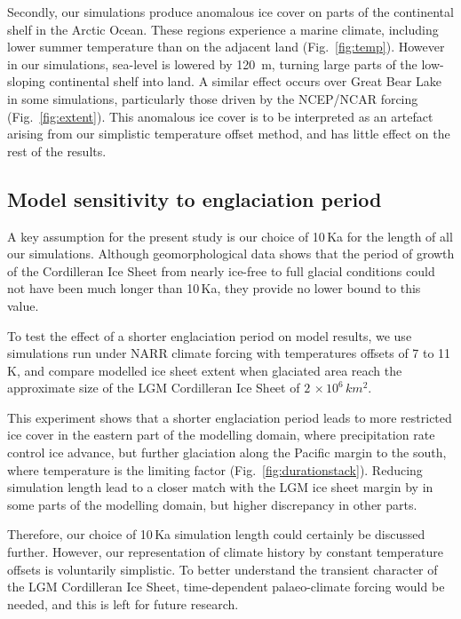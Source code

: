 Secondly, our simulations produce anomalous ice cover on parts of the continental shelf in the Arctic Ocean. These regions experience a marine climate, including lower summer temperature than on the adjacent land (Fig.~\ref{fig:temp}). However in our simulations, sea-level is lowered by 120~m, turning large parts of the low-sloping continental shelf into land. A similar effect occurs over Great Bear Lake in some simulations, particularly those driven by the NCEP/NCAR forcing (Fig.~\ref{fig:extent}). This anomalous ice cover is to be interpreted as an artefact arising from our simplistic temperature offset method, and has little effect on the rest of the results.

\subsection{Model sensitivity to englaciation period}

A key assumption for the present study is our choice of 10\,Ka for the length of all our simulations. Although geomorphological data shows that the period of growth of the Cordilleran Ice Sheet from nearly ice-free to full glacial conditions could not have been much longer than 10\,Ka, they provide no lower bound to this value.

To test the effect of a shorter englaciation period on model results, we use simulations run under NARR climate forcing with temperatures offsets of 7 to 11\,K, and compare modelled ice sheet extent when glaciated area reach the approximate size of the LGM Cordilleran Ice Sheet of $2\,\times10^6\,\unit{km^2}$.

This experiment shows that a shorter englaciation period leads to more restricted ice cover in the eastern part of the modelling domain, where precipitation rate control ice advance, but further glaciation along the Pacific margin to the south, where temperature is the limiting factor (Fig.~\ref{fig:durationstack}). Reducing simulation length lead to a closer match with the LGM ice sheet margin by \citet{dyke-2004} in some parts of the modelling domain, but higher discrepancy in other parts.

Therefore, our choice of 10\,Ka simulation length could certainly be discussed further. However, our representation of climate history by constant temperature offsets is voluntarily simplistic. To better understand the transient character of the LGM Cordilleran Ice Sheet, time-dependent palaeo-climate forcing would be needed, and this is left for future research.

